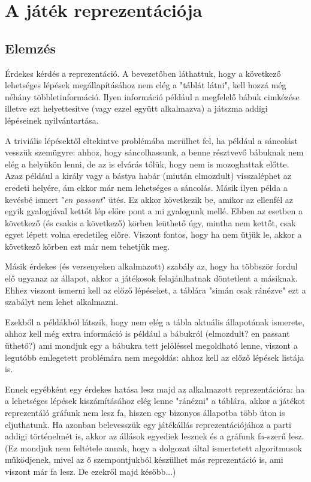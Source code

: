\documentclass[twoside, a4paper, 12pt]{article}
\begin{document}
\section{A játék reprezentációja}
\subsection{Elemzés}
Érdekes kérdés a reprezentáció. A bevezetőben láthattuk, hogy a következő lehetséges lépések megállapításához nem elég a "táblát látni", kell hozzá még néhány többletinformáció. Ilyen információ például a megfelelő bábuk cimkézése illetve ezt helyettesítve (vagy ezzel együtt alkalmazva) a játszma addigi lépéseinek nyilvántartása.

A triviális lépésektől eltekintve problémába merülhet fel, ha például a sáncolást vesszük szemügyre: ahhoz, hogy sáncolhassunk, a benne résztvevő bábuknak nem elég a helyükön lenni, de az is elvárás tőlük, hogy nem is mozoghattak előtte. Azaz például a király vagy a bástya habár (miután elmozdult) visszaléphet az eredeti helyére, ám ekkor már nem lehetséges a sáncolás. Másik ilyen példa a kevésbé ismert "\textit{en passant}" ütés. Ez akkor következik be, amikor az ellenfél az egyik gyalogjával kettőt lép előre pont a mi gyalogunk mellé. Ebben az esetben a következő (és csakis a következő) körben leüthető úgy, mintha nem kettőt, csak egyet lépett volna eredetileg előre. Viszont fontos, hogy ha nem ütjük le, akkor a következő körben ezt már nem tehetjük meg.

Másik érdekes (és versenyeken alkalmazott) szabály az, hogy ha többször fordul elő ugyanaz az állapot, akkor a játékosok felajánlhatnak döntetlent a másiknak. Ehhez viszont ismerni kell az előző lépéseket, a táblára "simán csak ránézve" ezt a szabályt nem lehet alkalmazni.

Ezekből a példákból látszik, hogy nem elég a tábla aktuális állapotának ismerete, ahhoz kell még extra információ is például a bábukról (elmozdult? en passant üthető?) ami mondjuk egy a bábukra tett jelöléssel megoldható lenne, viszont a legutóbb emlegetett problémára nem megoldás: ahhoz kell az előző lépések listája is.

Ennek egyébként egy érdekes hatása lesz majd az alkalmazott reprezentációra: ha a lehetséges lépések kiszámításához elég lenne "ránézni" a táblára, akkor a játékot reprezentáló gráfunk nem lesz fa, hiszen egy bizonyos állapotba több úton is eljuthatunk. Ha azonban belevesszük egy játékállás reprezentációjához a parti addigi történelmét is, akkor az állások egyediek lesznek és a gráfunk fa-szerű lesz. (Ez mondjuk nem feltétele annak, hogy a dolgozat által ismertetett algoritmusok működjenek, mivel az ő szempontjukból készülhet más reprezentáció is, ami viszont már fa lesz. De ezekről majd később...)
\end{document}
